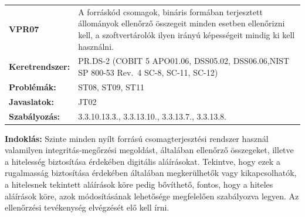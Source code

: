 \documentclass[12pt,magyar,a4paper,oneside]{scrreprt}
\begin{document}
\begin{longtable}[]{@{}ll@{}}
\toprule
\endhead
\begin{minipage}[t]{0.16\columnwidth}\raggedright
\textbf{VPR07}\strut
\end{minipage} & \begin{minipage}[t]{0.79\columnwidth}\raggedright
A forráskód csomagok, bináris formában terjesztett állományok ellenőrző
összegeit minden esetben ellenőrizni kell, a szoftvertárolók ilyen
irányú képességeit mindig ki kell használni.\strut
\end{minipage}\tabularnewline
\begin{minipage}[t]{0.16\columnwidth}\raggedright
\textbf{Keretrendszer:}\strut
\end{minipage} & \begin{minipage}[t]{0.79\columnwidth}\raggedright
PR.DS-2 (COBIT 5 APO01.06, DSS05.02, DSS06.06,NIST SP 800-53 Rev.~4
SC-8, SC-11, SC-12)\strut
\end{minipage}\tabularnewline
\begin{minipage}[t]{0.16\columnwidth}\raggedright
\textbf{Problémák:}\strut
\end{minipage} & \begin{minipage}[t]{0.79\columnwidth}\raggedright
ST08, ST09, ST11\strut
\end{minipage}\tabularnewline
\begin{minipage}[t]{0.16\columnwidth}\raggedright
\textbf{Javaslatok:}\strut
\end{minipage} & \begin{minipage}[t]{0.79\columnwidth}\raggedright
JT02\strut
\end{minipage}\tabularnewline
\begin{minipage}[t]{0.16\columnwidth}\raggedright
\textbf{Szabályozás:}\strut
\end{minipage} & \begin{minipage}[t]{0.79\columnwidth}\raggedright
3.3.10.13.3., 3.3.13.10., 3.3.13.7., 3.3.13.8.\strut
\end{minipage}\tabularnewline
\bottomrule
\end{longtable}

\textbf{Indoklás: } Szinte minden nyílt forrású csomagterjesztési
rendszer használ valamilyen integritás-megőrzési megoldást, általában
ellenőrző összegeket, illetve a hitelesség biztosítása érdekében
digitális aláírásokat. Tekintve, hogy ezek a rugalmasság biztosítása
érdekében általában megkerülhetők vagy kikapcsolhatók, a hitelesnek
tekintett aláírások köre pedig bővíthető, fontos, hogy a hiteles
aláírások köre, azok módosításának lehetősége megfelelően szabályozva
legyen. Az ellenőrzési tevékenység elvégzését elő kell írni.
\end{document}
